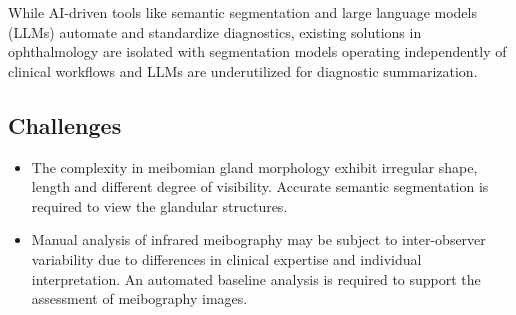 \documentclass{article}
\begin{document}
While AI-driven tools like semantic segmentation and large language models (LLMs) automate and standardize diagnostics, existing solutions in ophthalmology are isolated  with segmentation models operating independently of clinical workflows and LLMs are underutilized for diagnostic summarization. %



\subsection{Challenges}

\begin{itemize}
    \item The complexity in meibomian gland morphology exhibit irregular shape, length and different degree of visibility. Accurate semantic segmentation is required to view the glandular structures.
    \item Manual analysis of infrared meibography may be subject to inter-observer variability due to differences in clinical expertise and individual interpretation. An automated baseline analysis is required to support the assessment of meibography images.
    
\end{itemize}
\end{document}
